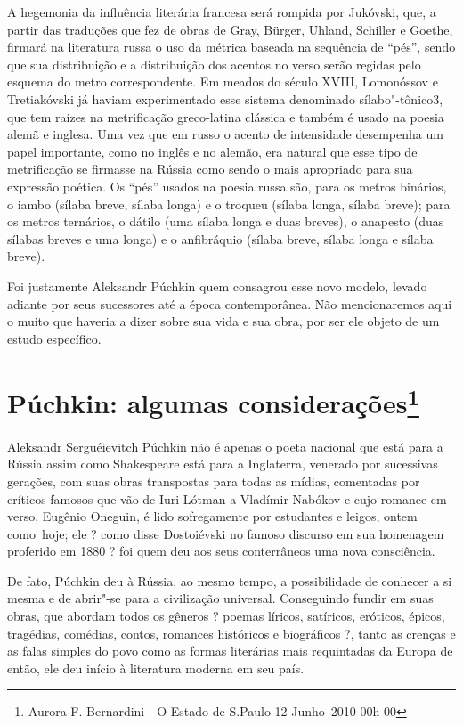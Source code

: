 A hegemonia da influência literária francesa será rompida por Jukóvski,
que, a partir das traduções que fez de obras de Gray, Bürger, Uhland,
Schiller e Goethe, firmará na literatura russa o uso da métrica baseada
na sequência de ``pés'', sendo que sua distribuição e a distribuição dos
acentos no verso serão regidas pelo esquema do metro correspondente. Em
meados do século XVIII, Lomonóssov e Tretiakóvski já haviam
experimentado esse sistema denomina­do sílabo"-tônico3, que tem raízes na
metrificação greco-latina clássica e tam­bém é usado na poesia alemã e
inglesa. Uma vez que em russo o acento de intensidade desempenha um
papel importante, como no inglês e no alemão, era natural que esse tipo
de metrificação se firmasse na Rússia como sendo o mais apropriado para
sua expressão poética. Os ``pés'' usados na poesia russa são, para os
metros binários, o iambo (sílaba breve, sílaba longa) e o troqueu
(sílaba longa, sílaba breve); para os metros ternários, o dátilo (uma
sílaba lon­ga e duas breves), o anapesto (duas sílabas breves e uma
longa) e o anfibráquio (sílaba breve, sílaba longa e sílaba breve).

Foi justamente Aleksandr Púchkin quem consagrou esse novo modelo, levado
adiante por seus sucessores até a época contemporânea. Não mencionaremos
aqui o muito que haveria a dizer sobre sua vida e sua obra, por ser ele
objeto de um estudo específico.

\chapter{Púchkin: algumas considerações\footnote{Aurora F. Bernardini -
  O Estado de S.Paulo 12 Junho~2010 \textbar{} 00h 00}}

Aleksandr Serguéievitch Púchkin não é apenas o poeta nacional que está
para a Rússia assim como Shakespeare está para a Inglaterra, venerado
por sucessivas gerações, com suas obras transpostas para todas as
mídias, comentadas por críticos famosos que vão de Iuri Lótman a
Vladímir Nabókov e cujo romance em verso, Eugênio Oneguin, é lido
sofregamente por estudantes e leigos, ontem como~hoje; ele ? como disse
Dostoiévski no famoso discurso em sua homenagem proferido em 1880 ? foi
quem deu aos seus conterrâneos uma nova consciência.

De fato, Púchkin deu à Rússia, ao mesmo tempo, a possibilidade de
conhecer a si mesma e de abrir"-se para a civilização universal.
Conseguindo fundir em suas obras, que abordam todos os gêneros ? poemas
líricos, satíricos, eróticos, épicos, tragédias, comédias, contos,
romances históricos e biográficos ?, tanto as crenças e as falas simples
do povo como as formas literárias mais requintadas da Europa de então,
ele deu início à literatura moderna em seu país.

